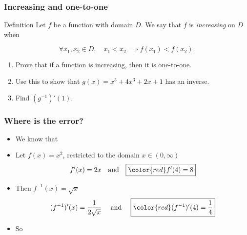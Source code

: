 \begin{frame}[t]
	\frametitle{Increasing and one-to-one}

	\begin{block}{Definition}
		Let $f$ be a function with domain $D$. We say that $f$ is \emph{increasing} on
		$D$ when

		\[
			\forall x_{1}, x_{2}\in D, \quad x_{1}<x_{2}\implies f(x_{1})<f(x_{2}).
		\]
	\end{block}

	\begin{enumerate}
		\item Prove that if a function is increasing, then it is one-to-one.

		\item Use this to show that $g(x) = x^{5}+ 4x^{3}+ 2x + 1$ has an inverse.

		\item Find $(g^{-1})'(1)$.
	\end{enumerate}
\end{frame}

\begin{frame}[t]
	\frametitle{Where is the error?}

	\begin{itemize}
		\item We know that 

		\item Let $\displaystyle f(x) = x^{2}$, restricted to the domain
			$\displaystyle x \in (0, \infty)$
			\[
				f'(x) = 2x \quad \text{and}\quad \boxed{{\color{red} f'(4) = 8}}
			\]

		\item Then $\displaystyle f^{-1}(x) = \sqrt{x}$
			\[
				(f^{-1})'(x) = \frac{1}{2\sqrt{x}}\quad \text{ and }\quad \boxed{{\color{red} (f^{-1})'(4) = \frac{1}{4}}}
			\]

		\item So 
	\end{itemize}
\end{frame}

